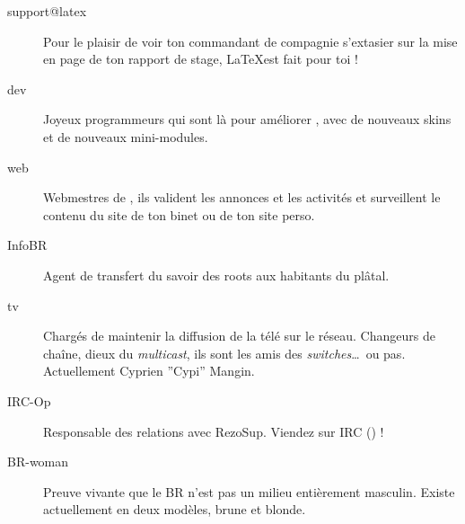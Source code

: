 \begin{description}
  \item[support@latex] {Pour le plaisir de voir ton commandant de compagnie s'extasier sur la mise en page de ton rapport de stage, \LaTeX est fait pour toi !}

  \item[dev]{Joyeux programmeurs qui sont l\`a pour am\'eliorer \fkz, avec de nouveaux skins et de nouveaux mini-modules.}


  \item[web] {Webmestres de \fkz, ils valident les annonces et les activit\'es et surveillent le contenu du site de ton binet ou de ton site perso.}


  \item[InfoBR]{Agent de transfert du savoir des roots aux habitants du pl\^atal.}

  \item[tv]{Charg\'es de maintenir la diffusion de la t\'el\'e sur le r\'eseau. Changeurs de cha\^ine, dieux du \emph{multicast},
  ils sont les amis des \emph{switches}\dots\ ou pas. Actuellement Cyprien ''Cypi'' Mangin.}


  \item[IRC-Op]{Responsable des relations avec RezoSup. Viendez sur IRC () !}


  \item[BR-woman]{Preuve vivante que le BR n'est pas un milieu enti\`erement masculin. Existe actuellement en deux modèles, brune et blonde.}

\end{description}

